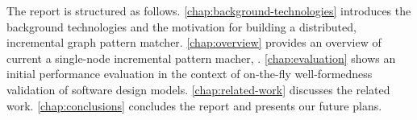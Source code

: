 The report is structured as follows. 
\autoref{chap:background-technologies} introduces the background technologies and the motivation for building a distributed, incremental graph pattern matcher. \autoref{chap:overview} provides an overview of current a single-node incremental pattern macher, \eiq{}. 
\autoref{chap:evaluation} shows an initial performance evaluation in the context of on-the-fly well-formedness validation of software design models. 
\autoref{chap:related-work} discusses the related work. \autoref{chap:conclusions} concludes the report and presents our future plans. 

